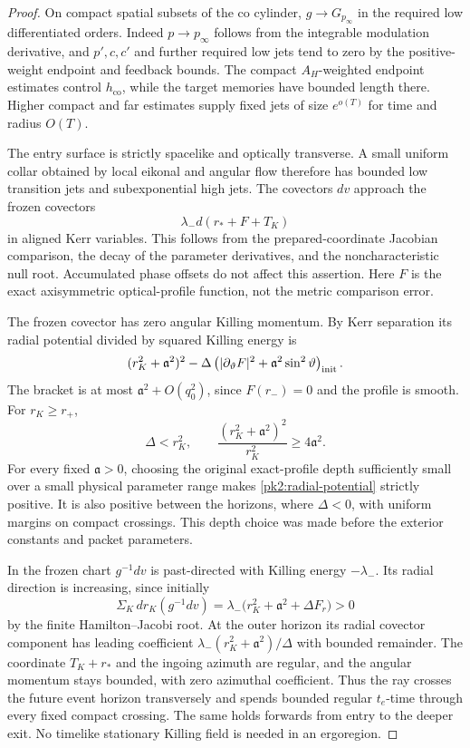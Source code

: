 \begin{proof}
On compact spatial subsets of the co cylinder,
$g\to G_{p_\infty}$ in the required low differentiated orders.
Indeed $p\to p_\infty$ follows from the integrable modulation
derivative, and $p',c,c'$ and further required low jets tend to zero
by the positive-weight endpoint and feedback bounds. The compact
$A_H$-weighted endpoint estimates control $h_{\mathrm{co}}$, while
the target memories have bounded length there. Higher compact and
far estimates supply fixed jets of size $e^{o(T)}$ for time and
radius $O(T)$.

The entry surface is strictly spacelike and optically transverse.
A small uniform collar obtained by local eikonal and angular flow
therefore has bounded low transition jets and subexponential high
jets. The covectors $dv$ approach the frozen covectors
\[
 \lambda_-d(r_*+F+T_K)
\]
in aligned Kerr variables. This follows from the prepared-coordinate
Jacobian comparison, the decay of the parameter derivatives, and the
noncharacteristic null root. Accumulated phase offsets do not affect
this assertion. Here $F$ is the exact axisymmetric optical-profile
function, not the metric comparison error.

The frozen covector has zero angular Killing momentum. By Kerr
separation its radial potential divided by squared Killing energy is
\begin{equation}
 (r_K^2+\mathfrak a^2)^2
   -\Delta\left(|\partial_\vartheta F|^2
                         +\mathfrak a^2\sin^2\vartheta\right)_{\rm init}.
 \label{pk2:radial-potential}
\end{equation}
The bracket is at most $\mathfrak a^2+O(q_0^2)$, since
$F(r_-)=0$ and the profile is smooth. For $r_K\ge r_+$,
\[
 \Delta<r_K^2,
 \qquad
 \frac{(r_K^2+\mathfrak a^2)^2}{r_K^2}\ge4\mathfrak a^2.
\]
For every fixed $\mathfrak a>0$, choosing the original exact-profile
depth sufficiently small over a small physical parameter range
makes \eqref{pk2:radial-potential} strictly positive. It is also
positive between the horizons, where $\Delta<0$, with uniform
margins on compact crossings. This depth choice was made before the
exterior constants and packet parameters.

In the frozen chart $g^{-1}dv$ is past-directed with Killing energy
$-\lambda_-$. Its radial direction is increasing, since initially
\[
 \Sigma_K\,dr_K(g^{-1}dv)
   =\lambda_-\bigl(r_K^2+\mathfrak a^2+\Delta F_r\bigr)>0
\]
by the finite Hamilton--Jacobi root. At the outer horizon its radial
covector component has leading coefficient
$\lambda_-(r_K^2+\mathfrak a^2)/\Delta$ with bounded remainder.
The coordinate $T_K+r_*$ and the ingoing azimuth are regular, and
the angular momentum stays bounded, with zero azimuthal coefficient.
Thus the ray crosses the future event horizon transversely and
spends bounded regular $t_e$-time through every fixed compact
crossing. The same holds forwards from entry to the deeper exit.
No timelike stationary Killing field is needed in an ergoregion.


\end{proof}
